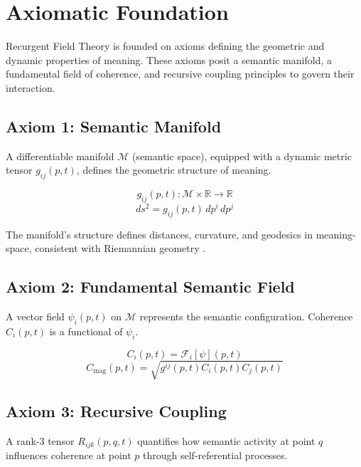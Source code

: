 \chapter{Axiomatic Foundation}

Recurgent Field Theory is founded on axioms defining the geometric and dynamic properties of meaning. These axioms posit a semantic manifold, a fundamental field of coherence, and recursive coupling principles to govern their interaction.

\section{Axiom 1: Semantic Manifold}

A differentiable manifold \(\mathcal{M}\) (semantic space), equipped with a dynamic metric tensor \(g_{ij}(p,t)\), defines the geometric structure of meaning.

\begin{equation}
g_{ij}(p,t) : \mathcal{M} \times \mathbb{R} \rightarrow \mathbb{R}
\end{equation}
\begin{equation}
ds^2 = g_{ij}(p,t) \, dp^i \, dp^j
\end{equation}

The manifold's structure defines distances, curvature, and geodesics in meaning-space, consistent with Riemannian geometry \autocite{Riemann1868}.

\section{Axiom 2: Fundamental Semantic Field}

A vector field \(\psi_i(p,t)\) on \(\mathcal{M}\) represents the semantic configuration. Coherence \(C_i(p,t)\) is a functional of \(\psi_i\).

\begin{equation}
C_i(p,t) = \mathcal{F}_i[\psi](p,t)
\end{equation}
\begin{equation}
C_{\text{mag}}(p,t) = \sqrt{g^{ij}(p,t) C_i(p,t) C_j(p,t)}
\end{equation}

\section{Axiom 3: Recursive Coupling}

A rank-3 tensor \(R_{ijk}(p,q,t)\) quantifies how semantic activity at point \(q\) influences coherence at point \(p\) through self-referential processes.


